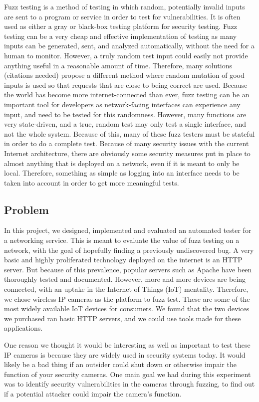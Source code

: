 \documentclass[letterpaper,twocolumn,10pt]{article}
\begin{document}
Fuzz testing is a method of testing in which random, potentially invalid inputs are sent to a program or service in order to test for vulnerabilities. It is often used as either a gray or black-box testing platform for security testing. Fuzz testing can be a very cheap and effective implementation of testing as many inputs can be generated, sent, and analyzed automatically, without the need for a human to monitor. However, a truly random test input could easily not provide anything useful in a reasonable amount of time. Therefore, many solutions (citations needed) propose a different method where random mutation of good inputs is used so that requests that are close to being correct are used. 
Because the world has become more internet-connected than ever, fuzz testing can be an important tool for developers as network-facing interfaces can experience any input, and need to be tested for this randomness. However, many functions are very state-driven, and a true, random test may only test a single interface, and not the whole system. Because of this, many of these fuzz testers must be stateful in order to do a complete test. Because of many security issues with the current Internet architecture, there are obviously some security measures put in place to almost anything that is deployed on a network, even if it is meant to only be local. Therefore, something as simple as logging into an interface needs to be taken into account in order to get more meaningful tests.

\subsection{Problem}

In this project, we designed, implemented and evaluated an automated tester for a networking service. This is meant to evaluate the value of fuzz testing on a network, with the goal of hopefully finding a previously undiscovered bug. A very basic and highly proliferated technology deployed on the internet is an HTTP server. But because of this prevalence, popular servers such as Apache have been thoroughly tested and documented. However, more and more devices are being connected, with an uptake in the Internet of Things (IoT) mentality. Therefore, we chose wireless IP cameras as the platform to fuzz test. These are some of the most widely available IoT devices for consumers. We found that the two devices we purchased ran basic HTTP servers, and we could use tools made for these applications. 

One reason we thought it would be interesting as well as important to test these IP cameras is because they are widely used in security systems today. It would likely be a bad thing if an outsider could shut down or otherwise impair the function of your security cameras. One main goal we had during this experiment was to identify security vulnerabilities in the cameras through fuzzing, to find out if a potential attacker could impair the camera's function.   
\end{document}
